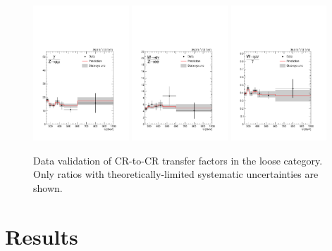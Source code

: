 \begin{figure}[]
    \begin{center}
        \includegraphics[width=0.32\textwidth]{figures/monotop/ratios/ratio_loose_pho_zmm_shapes_fit_b.pdf}
        \includegraphics[width=0.32\textwidth]{figures/monotop/ratios/ratio_loose_wen_zee_shapes_fit_b.pdf}
        \includegraphics[width=0.32\textwidth]{figures/monotop/ratios/ratio_loose_wmn_pho_shapes_fit_b.pdf}
        \caption{Data validation of CR-to-CR transfer factors in the loose category. Only ratios with theoretically-limited systematic uncertainties are shown.}
        \label{fig:mt:dataval}
    \end{center}
\end{figure}


\section{Results}

